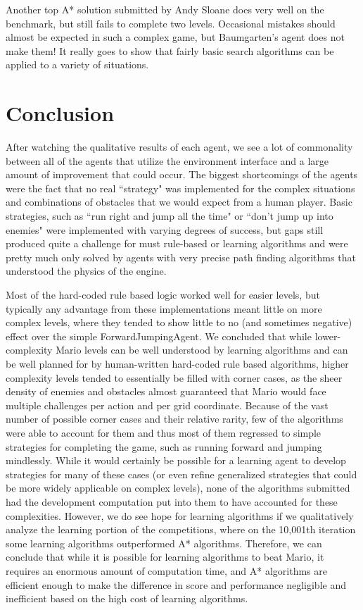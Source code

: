 \documentclass[12pt]{article}
\begin{document}
\begin{multicols*}{2}
Another  top A* solution submitted by Andy Sloane does very well on the benchmark, 
but still fails to complete 
two levels.  Occasional mistakes should almost be expected in such a complex game, but 
Baumgarten's agent does not make them!  It really goes to show that fairly basic search algorithms 
can be applied to a variety of situations.

\section *{Conclusion}
After watching the qualitative results of each agent, we see a lot of commonality between all of the agents that 
utilize the environment interface and a large amount of improvement that could occur. The biggest shortcomings of the
agents were the fact that no real ``strategy" was implemented for the complex situations and combinations of obstacles that 
we would expect from a human player. Basic strategies, such as ``run right and jump all the time" or ``don't jump up into enemies" 
were implemented with varying degrees of success, but gaps still produced quite a challenge for must rule-based or learning algorithms
and were pretty much only solved by agents with very precise path finding algorithms that understood the physics of the engine. 

Most of the hard-coded rule based logic worked well for easier levels, but typically any advantage from these implementations 
meant little on more complex levels, where they tended to show little to no (and sometimes negative) effect over 
the simple ForwardJumpingAgent. We concluded that while lower-complexity Mario levels can be well understood by 
learning algorithms and can be well planned for by human-written hard-coded rule based algorithms, higher complexity levels
tended to essentially be filled with corner cases, as the sheer density of enemies and obstacles almost guaranteed that Mario would face multiple
challenges per action and per grid coordinate. Because of the vast number of possible corner cases and their relative rarity, few of the algorithms
were able to account for them and thus most of them regressed to simple strategies for completing the game, such as running forward and jumping
mindlessly. While it would certainly be possible for a learning agent to develop strategies for many of these cases (or even refine generalized strategies
that could be more widely applicable on complex levels), none of the algorithms submitted had the development computation put into them to have
accounted for these complexities. However, we do see hope for learning algorithms if we qualitatively analyze the learning portion of the competitions, 
where on the 10,001th iteration some learning algorithms outperformed A* algorithms. Therefore, we can conclude that while it is possible for learning 
algorithms to beat Mario, it requires an enormous amount of computation time, and A* algorithms are efficient enough to make the difference in score and 
performance negligible and inefficient based on the high cost of learning algorithms.


\end{multicols*}
\end{document}
